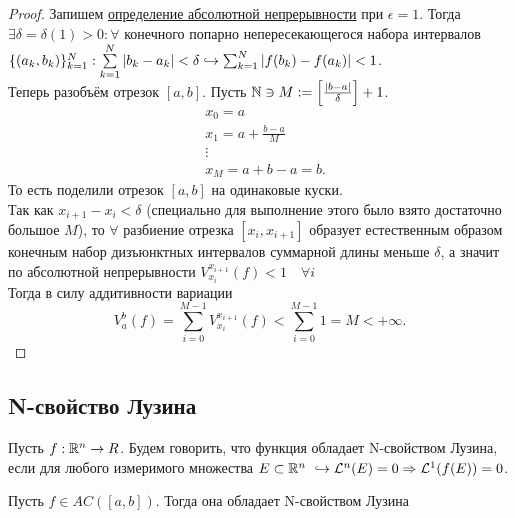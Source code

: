 \begin{proof}
	Запишем \hyperref[def:ac]{определение абсолютной непрерывности} при $\epsilon = 1$. Тогда $\exists \delta = \delta(1) > 0: \forall$ конечного попарно непересекающегося набора интервалов $\{(a_k, b_k)\}_{k=1}^N: \sum\limits_{k=1}^{N} |b_k - a_k| < \delta \hookrightarrow \sum_{k=1}^{N} |f(b_k) - f(a_k)| < 1$.\\
	Теперь разобъём отрезок $[a, b]$. Пусть $\mathbb{N} \ni M := \left[\frac{|b - a|}{\delta}\right] + 1$.
	\[\begin{aligned}
		&x_0 = a \\
		&x_1 = a + \frac{b - a}{M} \\
		&\vdots \\
		&x_M = a + b - a = b.
	\end{aligned}\]
	То есть поделили отрезок $[a, b]$ на одинаковые куски.\\
	Так как $x_{i+1} - x_i < \delta$ (специально для выполнение этого было взято достаточно большое $M$), то $\forall$ разбиение отрезка $[x_i, x_{i+1}]$ образует естественным образом конечным набор дизъюнктных интервалов суммарной длины меньше $\delta$, а значит по абсолютной непрерывности $V_{x_i}^{x_{i+1}}(f) < 1 \quad \forall i$\\
	Тогда в силу аддитивности вариации\\
	\[
		V_a^b(f) =
		\sum_{i=0}^{M-1} V_{x_i}^{x_{i+1}} (f)
		<
		\sum_{i=0}^{M-1} 1 = M < +\infty.
	\]
\end{proof}

\subsection{N-свойство Лузина}

\begin{definition}
	Пусть $f: \mathbb{R}^n \rightarrow R$. Будем говорить, что функция обладает N-свойством Лузина, если для любого измеримого множества $E \subset \R^n \ \hookrightarrow \LL^n(E) = 0 \Rightarrow \LL^1(f(E)) = 0$.
\end{definition}

\begin{theorem}
	Пусть $f \in AC([a, b])$. Тогда она обладает N-свойством Лузина
\end{theorem}

